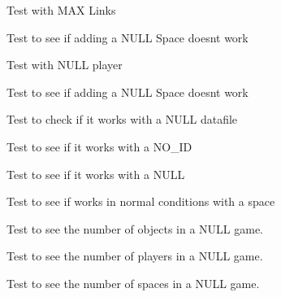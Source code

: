 \begin{DoxyRefList}
Test with M\+AX Links  
\item[\label{test__test000049}%
\hypertarget{test__test000049}{}%
Member \hyperlink{game__test_8h_ac6b7f7180414f14b0ca9629999da9f75}{test3\+\_\+game\+\_\+add\+\_\+object} ()]Test to see if adding a N\+U\+LL Space doesn\textquotesingle{}t work  
\item[\label{test__test000044}%
\hypertarget{test__test000044}{}%
Member \hyperlink{game__test_8h_aae8f72a6c0030f8ecf6b27e8cc218d08}{test3\+\_\+game\+\_\+add\+\_\+player} ()]Test with N\+U\+LL player  
\item[\label{test__test000040}%
\hypertarget{test__test000040}{}%
Member \hyperlink{game__test_8h_a7d77ce55d38ea58e076f160dc0ea019c}{test3\+\_\+game\+\_\+add\+\_\+space} ()]Test to see if adding a N\+U\+LL Space doesn\textquotesingle{}t work  
\item[\label{test__test000030}%
\hypertarget{test__test000030}{}%
Member \hyperlink{game__test_8h_a7f6e56d152bfbaab1aa140f7bf6494a1}{test3\+\_\+game\+\_\+create\+\_\+from\+\_\+file} ()]Test to check if it works with a N\+U\+LL datafile  
\item[\label{test__test000069}%
\hypertarget{test__test000069}{}%
Member \hyperlink{game__test_8h_aa2d9c89ee35519890e43765fc1fc1277}{test3\+\_\+game\+\_\+find} ()]Test to see if it works with a N\+O\+\_\+\+ID  
\item[\label{test__test000072}%
\hypertarget{test__test000072}{}%
Member \hyperlink{game__test_8h_a36c785fccb9a27f47e0e8a75b95ca465}{test3\+\_\+game\+\_\+find\+\_\+name} ()]Test to see if it works with a N\+U\+LL  
\item[\label{test__test000084}%
\hypertarget{test__test000084}{}%
Member \hyperlink{game__test_8h_a05b101ce9a7d4c4599f13547de2ded54}{test3\+\_\+game\+\_\+get\+\_\+last\+\_\+check} ()]Test to see if works in normal conditions with a space  
\item[\label{test__test000063}%
\hypertarget{test__test000063}{}%
Member \hyperlink{game__test_8h_a0ffd506d0a39ef21dd95674bab10db41}{test3\+\_\+game\+\_\+get\+\_\+objects\+\_\+number} ()]Test to see the number of objects in a N\+U\+LL game.  
\item[\label{test__test000059}%
\hypertarget{test__test000059}{}%
Member \hyperlink{game__test_8h_aea376050c113263f20a53d26b951be06}{test3\+\_\+game\+\_\+get\+\_\+players\+\_\+number} ()]Test to see the number of players in a N\+U\+LL game.  
\item[\label{test__test000055}%
\hypertarget{test__test000055}{}%
Member \hyperlink{game__test_8h_aa1f4bf660db3c61f70d3c96cb0c1a3e8}{test3\+\_\+game\+\_\+get\+\_\+spaces\+\_\+number} ()]Test to see the number of spaces in a N\+U\+LL game.  

\end{DoxyRefList}
